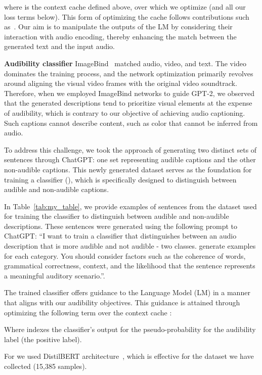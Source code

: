 \documentclass{article}
\begin{document}
where  is the context cache defined above, over which we optimize  (and all our loss terms below). This form of optimizing the cache follows contributions such as~\cite{Dathathri2020Plug}. Our aim is to manipulate the outputs of the LM by considering their interaction with audio encoding, thereby enhancing the match between the generated text and the input audio.

 


\noindent\textbf{Audibility classifier\quad}
ImageBind~\cite{girdhar2023imagebind} matched audio, video, and text. The video dominates the training process, and the network optimization primarily revolves around aligning the visual video frames with the original video soundtrack. Therefore, when we employed ImageBind networks to guide GPT-2, we observed that the generated descriptions tend to prioritize visual elements at the expense of audibility, which is contrary to our objective of achieving audio captioning. Such captions cannot describe content, such as color that cannot be inferred from audio.

To address this challenge, we took the approach of generating two distinct sets of sentences through ChatGPT: one set representing audible captions and the other non-audible captions. This newly generated dataset serves as the foundation for training a classifier (), which is specifically designed to distinguish between audible and non-audible captions.

In Table~\ref{tab:my_table}, we provide examples of sentences from the dataset used for training the classifier to distinguish between audible and non-audible descriptions. These sentences were generated using the following prompt to ChatGPT: ``I want to train a classifier that distinguishes between an audio description that is more audible and not audible - two classes. generate examples for each category. You should consider factors such as the coherence of words, grammatical correctness, context, and the likelihood that the sentence represents a meaningful auditory scenario.''.

The trained classifier  offers guidance to the Language Model (LM) in a manner that aligns with our audibility objectives. This guidance is attained through optimizing the following term over the context cache :


Where  indexes the classifier's output for the pseudo-probability for the audibility label (the positive label).

For  we used DistilBERT architecture~\cite{sanh2019distilbert}, which is effective for the dataset we have collected (15,385 samples).
\end{document}
